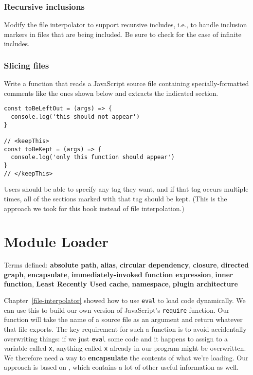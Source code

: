 \documentclass[krantzl]{krantz}
\newcommand{\chapref}[1]{Chapter~\ref{#1}}
\newcommand{\glossref}[1]{\textbf{#1}}
\begin{document}
\subsection*{Recursive inclusions}


Modify the file interpolator to support recursive includes,
i.e.,
to handle inclusion markers in files that are being included.
Be sure to check for the case of infinite includes.

\subsection*{Slicing files}


Write a function that reads a JavaScript source file
containing specially-formatted comments like the ones shown below
and extracts the indicated section.

\begin{lstlisting}[frame=tblr]
const toBeLeftOut = (args) => {
  console.log('this should not appear')
}

// <keepThis>
const toBeKept = (args) => {
  console.log('only this function should appear')
}
// </keepThis>
\end{lstlisting}


Users should be able to specify any tag they want,
and if that tag occurs multiple times,
all of the sections marked with that tag should be kept.
(This is the approach we took for this book instead of file interpolation.)

\chapter{Module Loader}\label{module-loader}


\noindent 
  Terms defined: \glossref{absolute path}, \glossref{alias}, \glossref{circular dependency}, \glossref{closure}, \glossref{directed graph}, \glossref{encapsulate}, \glossref{immediately-invoked function expression}, \glossref{inner function}, \glossref{Least Recently Used cache}, \glossref{namespace}, \glossref{plugin architecture}



\chapref{file-interpolator} showed how to use \texttt{eval} to load code dynamically.
We can use this to build our own version of JavaScript’s \texttt{require} function.
Our function will take the name of a source file as an argument
and return whatever that file exports.
The key requirement for such a function is to avoid accidentally overwriting things:
if we just \texttt{eval} some code and it happens to assign to a variable called \texttt{x},
anything called \texttt{x} already in our program might be overwritten.
We therefore need a way to \glossref{encapsulate} the contents of what we’re loading.
Our approach is based on \cite{Casciaro2020},
which contains a lot of other useful information as well.
\end{document}
